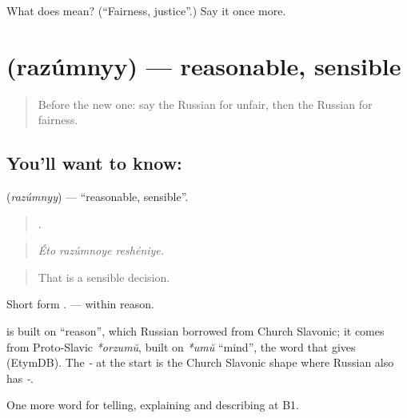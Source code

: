 \begin{tcolorbox}[breakable,colback=teal!4,colframe=teal!35!black,title={Before you move on}]
What does  mean? (\textquotedblleft{}Fairness, justice\textquotedblright{}.) Say it once more.
\end{tcolorbox}
\section[\texorpdfstring{\ru{разумный} (razúmnyy)}{разумный (razúmnyy)}]{ (razúmnyy) — reasonable, sensible}

\label{lesson:RU-C345-razumnyy}



\begin{quote}
Before the new one: say the Russian for unfair, then the Russian for fairness.
\end{quote}

\subsection*{You'll want to know: }
\textbf{} (\emph{razúmnyy}) — \textquotedblleft{}reasonable, sensible\textquotedblright{}.

\begin{quote}
  .
\end{quote}

\begin{quote}
\emph{Éto razúmnoye reshéniye.}
\end{quote}

\begin{quote}
That is a sensible decision.
\end{quote}

Short form \emph{}. \emph{  } — within reason.

\begin{cousinweb}
\textbf{} is built on \emph{} \textquotedblleft{}reason\textquotedblright{}, which Russian borrowed from Church Slavonic; it comes from Proto-Slavic \emph{*orzumŭ}, built on \emph{*umŭ} \textquotedblleft{}mind\textquotedblright{}, the word that gives \emph{} (EtymDB). The \emph{-} at the start is the Church Slavonic shape where Russian also has \emph{-}.
\end{cousinweb}

\begin{grammarlens}[title={What you've built}]
One more word for telling, explaining and describing at B1.
\end{grammarlens}

